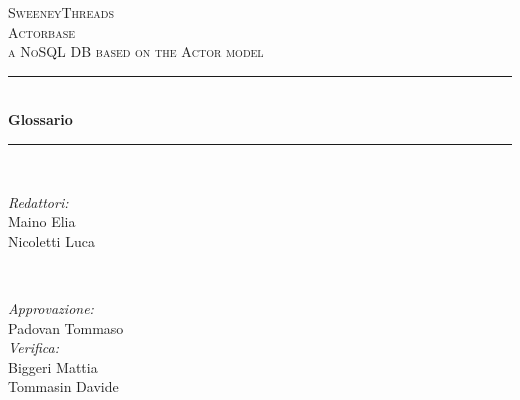 \documentclass[a4paper]{report}
\begin{document}
	
	\begin{titlepage}
		\newcommand{\HRule}{\rule{\linewidth}{0.5mm}} 
		\center  
		
		\textsc{\LARGE SweeneyThreads}\\[1.5cm] 
		\textsc{\Large Actorbase}\\[0.5cm] 
		\textsc{\large a NoSQL DB based on the Actor model}\\[0.5cm]
		
		
		\HRule \\[0.4cm]
		{ \huge \bfseries Glossario}\\[0.4cm] 
		\HRule \\[1.5cm]
		
		\begin{minipage}{0.4\textwidth}
			\begin{flushleft} \large
				\emph{Redattori:}\\
				Maino Elia\\
				Nicoletti Luca
			\end{flushleft}
		\end{minipage}
		~
		\begin{minipage}{0.4\textwidth}
			\begin{flushright} \large
				\emph{Approvazione:} \\
				Padovan Tommaso \\
				\emph{Verifica:} \\
				Biggeri Mattia \\
				Tommasin Davide 
			\end{flushright}
		\end{minipage}
		

\end{titlepage}
\end{document}
